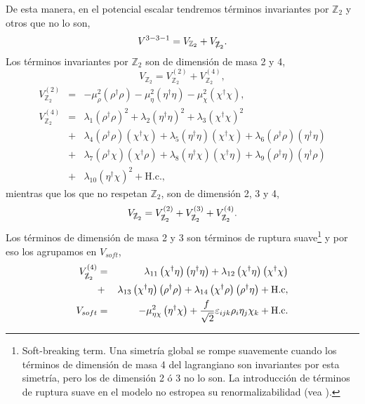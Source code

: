 De esta manera, en el potencial escalar tendremos términos invariantes por $\mathbb{Z}_2$ y otros que no lo son,
\begin{equation}
V^{3-3-1} = V_{\mathbb{Z}_2} + V_{\slashed{\mathbb{Z}}_2}.
\end{equation}
Los términos invariantes por $\mathbb{Z}_2$ son de dimensión de masa 2 y 4,
\begin{equation}
V_{\mathbb{Z}_2} = V_{\mathbb{Z}_2}^{(2)} + V_{\mathbb{Z}_2}^{(4)},
\end{equation}
\begin{eqnarray}
V_{\mathbb{Z}_2}^{(2)} &=& -\mu_\rho^2 \left( \rho^{\dagger}\rho \right) -\mu_\eta^2 \left( \eta^{\dagger}\eta \right) -\mu_\chi^2 \left( \chi^{\dagger}\chi \right), \nonumber \\
V_{\mathbb{Z}_2}^{(4)} &=& \lambda_1 \left( \rho^{\dagger}\rho \right)^2 + \lambda_2 \left( \eta^{\dagger}\eta \right)^2 + \lambda_3 \left( \chi^{\dagger}\chi \right)^2 \nonumber \\
&+& \lambda_4 \left( \rho^{\dagger}\rho \right) \left( \chi^{\dagger}\chi \right) + \lambda_5 \left( \eta^{\dagger}\eta \right) \left( \chi^{\dagger}\chi \right) + \lambda_6 \left( \rho^{\dagger}\rho \right) \left( \eta^{\dagger}\eta \right) \nonumber \\
&+& \lambda_7 \left( \rho^{\dagger}\chi \right) \left( \chi^{\dagger}\rho \right) + \lambda_8 \left( \eta^{\dagger}\chi \right) \left( \chi^{\dagger}\eta \right) + \lambda_9 \left( \rho^{\dagger}\eta \right) \left( \eta^{\dagger}\rho \right) \nonumber \\
&+& \lambda_{10} \left( \eta^{\dagger}\chi \right)^2 + \text{H.c.},
\end{eqnarray}
mientras que los que no respetan $\mathbb{Z}_2$, son de dimensión 2, 3 y 4,
\begin{equation}
V_{\slashed{\mathbb{Z}}_2} = V_{\slashed{\mathbb{Z}}_2}^{(2)} + V_{\slashed{\mathbb{Z}}_2}^{(3)} + V_{\slashed{\mathbb{Z}}_2}^{(4)}.
\end{equation}
Los términos de dimensión de masa 2 y 3 son términos de ruptura suave\footnote{Soft-breaking term. Una simetría global se rompe suavemente cuando los términos de dimensión de masa 4 del lagrangiano son invariantes por esta simetría, pero los de dimensión 2 ó 3 no lo son. La introducción de términos de ruptura suave en el modelo no estropea su renormalizabilidad (vea \cite{Ferreira:2022gjh}).} y por eso los agrupamos en $V_{soft}$,
\begin{eqnarray}
V_{\slashed{\mathbb{Z}}_2}^{(4)} &=& \lambda_{11}\left( \chi^{\dagger}\eta \right) \left( \eta^{\dagger}\eta \right) + \lambda_{12}\left( \chi^{\dagger}\eta \right) \left( \chi^{\dagger}\chi \right)   \nonumber \\
&+& \lambda_{13}\left( \chi^{\dagger}\eta \right) \left( \rho^{\dagger}\rho \right) + \lambda_{14}\left( \chi^{\dagger}\rho \right) \left( \rho^{\dagger}\eta \right) + \text{H.c}, \nonumber \\
V_{soft} &=& - \mu_{\eta\chi}^2 \left( \eta^{\dagger} \chi \right) + \frac{f \,}{\sqrt{2}} \varepsilon_{ijk} \rho_i \eta_j \chi_k + \text{H.c}.
\end{eqnarray}

